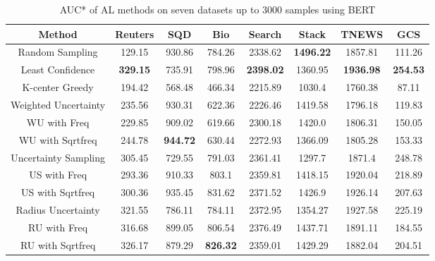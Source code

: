 \begin{table}[th]
	\centering
	\scriptsize
	\begin{tabular}{cccccccc}
		\toprule
		Method & Reuters & SQD & Bio & Search & Stack & TNEWS & GCS \\ \hline
		Random Sampling & 129.15 & 930.86 & 784.26 & 2338.62 & \textbf{1496.22} & 1857.81 & 111.26\\
		Least Confidence & \textbf{329.15} & 735.91 & 798.96 & \textbf{2398.02} & 1360.95 & \textbf{1936.98} & \textbf{254.53}   \\
		K-center Greedy & 194.42 & 568.48 & 466.34 & 2215.89 & 1030.4 & 1760.38 & 87.11  \\ \hline
		Weighted Uncertainty & 235.56 & 930.31 & 622.36 & 2226.46  & 1419.58 & 1796.18 & 119.83 \\
		WU with Freq & 229.85 & 909.02 & 619.66 & 2300.18  & 1420.0 & 1806.31 & 150.05 \\
		WU with Sqrtfreq & 244.78 & \textbf{944.72} & 630.44 & 2272.93 & 1366.09  & 1805.28 & 153.33 \\ \hline
		Uncertainty Sampling & 305.45 & 729.55 & 791.03 & 2361.41 & 1297.7  & 1871.4 & 248.78  \\
		US with Freq & 293.36 & 910.33 & 803.1 & 2359.81 & 1418.15 & 1920.04 & 218.89   \\
		US with Sqrtfreq & 300.36 & 935.45 & 831.62  & 2371.52 & 1426.9 & 1926.14 & 207.63 \\ \hline
		Radius Uncertainty & 321.55 & 786.11 & 784.11 & 2372.95& 1354.27 & 1927.58 & 225.19  \\
		RU with Freq & 316.68 & 899.05 & 806.54 & 2376.49 & 1437.71& 1891.11 & 184.55   \\
		RU with Sqrtfreq & 326.17 & 879.29 & \textbf{826.32} & 2359.01 & 1429.29 & 1882.04 &  204.51\\
		\hline
	\end{tabular}
\caption{AUC* of AL methods on seven datasets up to 3000 samples using BERT}
\label{table:auc_bert}
\end{table}

